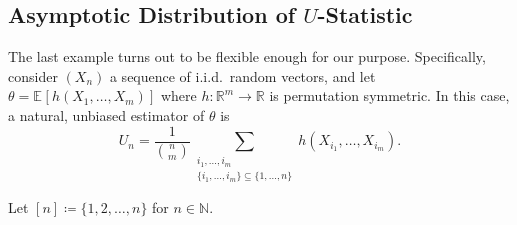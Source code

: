 \subsection{Asymptotic Distribution of \(U\)-Statistic}
The last example turns out to be flexible enough for our purpose. Specifically, consider \((X_n)\) a sequence of i.i.d.\ random vectors, and let \(\theta = \mathbb{E}_{}[h(X_1, \dots , X_m)] \) where \(h \colon \mathbb{R} ^m \to \mathbb{R} \) is permutation symmetric. In this case, a natural, unbiased estimator of \(\theta \) is
\[
	U_n
	= \frac{1}{\binom{n}{m}} \sum_{\substack{i_1, \dots , i_m \\ \{ i_1, \dots , i_m \} \subseteq \{ 1, \dots , n \} }} h(X_{i_1}, \dots , X_{i_m}).
\]

\begin{notation}
	Let \([n] \coloneqq \{ 1, 2, \dots , n \} \) for \(n \in \mathbb{N} \).
\end{notation}

